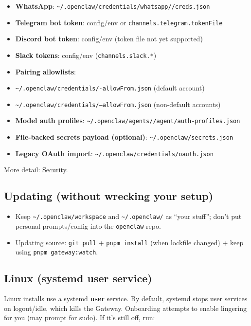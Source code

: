 \begin{itemize}
  \item \textbf{WhatsApp}: \texttt{\textasciitilde{}/.openclaw/credentials/whatsapp//creds.json}
  \item \textbf{Telegram bot token}: config/env or \texttt{channels.telegram.tokenFile}
  \item \textbf{Discord bot token}: config/env (token file not yet supported)
  \item \textbf{Slack tokens}: config/env (\texttt{channels.slack.*})
  \item \textbf{Pairing allowlists}:
  \item \texttt{\textasciitilde{}/.openclaw/credentials/-allowFrom.json} (default account)
  \item \texttt{\textasciitilde{}/.openclaw/credentials/--allowFrom.json} (non-default accounts)
  \item \textbf{Model auth profiles}: \texttt{\textasciitilde{}/.openclaw/agents//agent/auth-profiles.json}
  \item \textbf{File-backed secrets payload (optional)}: \texttt{\textasciitilde{}/.openclaw/secrets.json}
  \item \textbf{Legacy OAuth import}: \texttt{\textasciitilde{}/.openclaw/credentials/oauth.json}
\end{itemize}

More detail: \href{/gateway/security\#credential-storage-map}{Security}.

\subsection{Updating (without wrecking your setup)}


\begin{itemize}
  \item Keep \texttt{\textasciitilde{}/.openclaw/workspace} and \texttt{\textasciitilde{}/.openclaw/} as “your stuff”; don’t put personal prompts/config into the \texttt{openclaw} repo.
  \item Updating source: \texttt{git pull} + \texttt{pnpm install} (when lockfile changed) + keep using \texttt{pnpm gateway:watch}.
\end{itemize}


\subsection{Linux (systemd user service)}


Linux installs use a systemd \textbf{user} service. By default, systemd stops user
services on logout/idle, which kills the Gateway. Onboarding attempts to enable
lingering for you (may prompt for sudo). If it’s still off, run:

